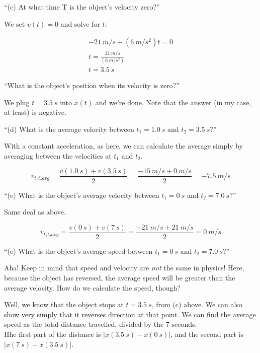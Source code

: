 \documentclass[12pt,a4paper]{report}
\begin{document}
``(c) At what time T is the object's velocity zero?''

We set $v(t) = 0$ and solve for $t$:

\begin{align}
- \SI{21}{m/s} + (\SI{6}{m/s^2}) t = 0\\
t = \frac{\SI{21}{m/s}}{(\SI{6}{m/s^2})}\\
t = \SI{3.5}{s}
\end{align}

``What is the object's position when its velocity is zero?''

We plug $t = \SI{3.5}{s}$ into $x(t)$ and we're done. Note that the answer (in my case, at least) is negative.

``(d) What is the average velocity between $t_1 = \SI{1.0}{s}$ and $t_2 = \SI{3.5}{s}$?''

With a constant acceleration, as here, we can calculate the average simply by averaging between the velocities at $t_1$ and $t_2$.

\begin{equation}
v_{t_1 t_2 avg} = \frac{v(\SI{1.0}{s}) + v(\SI{3.5}{s})}{2} = \frac{\SI{-15}{m/s} + \SI{0}{m/s}}{2} = \SI{-7.5}{m/s}
\end{equation}

``(e) What is the object's average velocity between $t_1 = \SI{0}{s}$ and $t_2 = \SI{7.0}{s}$?''

Same deal as above.

\begin{equation}
v_{t_1 t_2 avg} = \frac{v(\SI{0}{s}) + v(\SI{7}{s})}{2} = \frac{\SI{-21}{m/s} + \SI{21}{m/s}}{2} = \SI{0}{m/s}
\end{equation}

``(e) What is the object's average speed between $t_1 = \SI{0}{s}$ and $t_2 = \SI{7.0}{s}$?''

Aha! Keep in mind that speed and velocity are \emph{not} the same in physics! Here, because the object has reversed, the average speed will be greater than the average velocity. How do we calculate the speed, though?

Well, we know that the object stops at $t = \SI{3.5}{s}$, from (c) above. We can also show very simply that it reverses direction at that point.
We can find the average speed as the total distance travelled, divided by the 7 seconds.\\
Hhe first part of the distance is $|x(\SI{3.5}{s}) - x(\SI{0}{s})|$, and the second part is $|x(\SI{7}{s}) - x(\SI{3.5}{s})|$.
\end{document}
